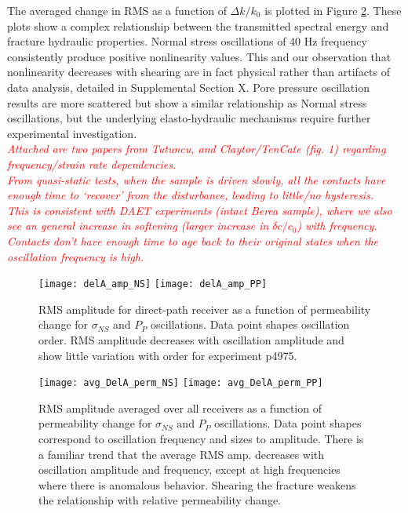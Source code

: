 The averaged change in RMS as a function of $ \Delta k/k_0 $ is plotted in Figure \ref{fig:dela_plots2}. These plots show a complex relationship between the transmitted spectral energy and fracture hydraulic properties. Normal stress oscillations of 40 Hz frequency consistently produce positive nonlinearity values. This and our observation that nonlinearity decreases with shearing are in fact physical rather than artifacts of data analysis, detailed in Supplemental Section X. Pore pressure oscillation results are more scattered but show a similar relationship as Normal stress oscillations, but the underlying elasto-hydraulic mechanisms require further experimental investigation.  
\\

\textit{\textcolor{red}{Attached are two papers from Tutuncu, and Claytor/TenCate (fig. 1) regarding frequency/strain rate dependencies. \\
From quasi-static tests, when the sample is driven slowly, all the contacts have enough time to ‘recover’ from the disturbance, leading to little/no hysteresis. \\
This is consistent with DAET experiments (intact Berea sample), where we also see an general increase in softening (larger increase in $ \delta c/c_0 $) with frequency. Contacts don’t have enough time to age back to their original states when the oscillation frequency is high.}}


\clearpage

\begin{figure}[ht]
	\centering
	\texttt{[image: delA\_amp\_NS]}
	\texttt{[image: delA\_amp\_PP]}
	\caption{RMS amplitude for direct-path receiver as a function of permeability change for $ \sigma_{NS} $ and $ P_P $ oscillations. Data point shapes oscillation order.  RMS amplitude decreases with oscillation amplitude and show little variation with order for experiment p4975. }
	\label{fig:delA_ns_amp}
\end{figure}

\clearpage


\begin{figure}[ht]
	\centering
	\texttt{[image: avg\_DelA\_perm\_NS]}
	\texttt{[image: avg\_DelA\_perm\_PP]}
	\caption{RMS amplitude averaged over all receivers as a function of permeability change for $ \sigma_{NS} $ and $ P_P $ oscillations. Data point shapes correspond to oscillation frequency and sizes to amplitude. There is a familiar trend that the average RMS amp. decreases with oscillation amplitude and frequency, except at high frequencies where there is anomalous behavior. Shearing the fracture weakens the relationship with relative permeability change.}
	\label{fig:dela_plots2}
\end{figure}

